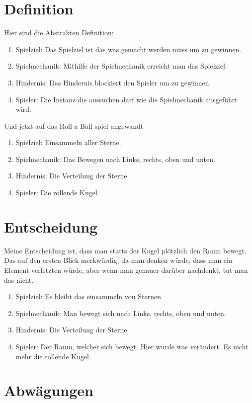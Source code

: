 \documentclass[11pt, a4paper]{article}
\begin{document}
\section{Definition}

Hier sind die Abstrakten Definition:
\begin{enumerate}
  \item Spielziel: Das Spielziel ist das was gemacht werden muss um zu gewinnen.
  \item Spielmechanik: Mithilfe der Spielmechanik erreicht man das Spielziel.
  \item Hindernis: Das Hindernis blockiert den Spieler um zu gewinnen.
  \item Spieler: Die Instanz die aussuchen darf wie die Spielmechanik ausgeführt wird.
\end{enumerate}

Und jetzt auf das Roll a Ball spiel angewandt

\begin{enumerate}
  \item Spielziel: Einsammeln aller Sterne.
  \item Spielmechanik: Das Bewegen nach Links, rechts, oben und unten.
  \item Hindernis: Die Verteilung der Sterne.
  \item Spieler: Die rollende Kugel.
\end{enumerate}

\section{Entscheidung}

Meine Entscheidung ist, dass man statts der Kugel plötzlich den Raum bewegt. Das auf den ersten Blick merkwürdig, da man denken würde, dass man ein Element verletzten würde, aber wenn man genauer darüber nachdenkt, tut man das nicht.

\begin{enumerate}
  \item Spielziel: Es bleibt das einsammeln von Sternen
  \item Spielmechanik: Man bewegt sich nach Links, rechts, oben und unten.
  \item Hindernis: Die Verteilung der Sterne.
  \item Spieler: Der Raum, welcher sich bewegt. Hier wurde was verändert. Es nicht mehr die rollende Kugel.
\end{enumerate}

\section{Abwägungen}
\end{document}
